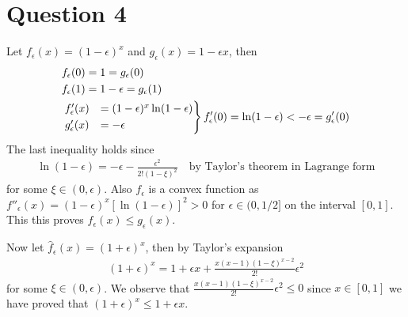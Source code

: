 \documentclass[a4paper,12pt]{article}
\theoremstyle{definition}
\begin{document}
\section*{Question 4}
Let $\label{eq:q4} f_\epsilon(x)=(1-\epsilon)^x$ and $\label{eq:q5}g_\epsilon(x)=1-\epsilon x$, then 
\begin{align*}
&f_\epsilon(0) = 1 = g_\epsilon(0)\\
&f_\epsilon(1) = 1-\epsilon = g_\epsilon(1)\\
&\begin{rcases}
 f'_\epsilon(x)&=(1-\epsilon)^x\ln (1-\epsilon) \\
  g'_\epsilon(x)&=-\epsilon \\
\end{rcases}f'_\epsilon(0) = \ln(1-\epsilon) < -\epsilon= g'_\epsilon(0)
\end{align*}
The last inequality holds since
\begin{align*}
\ln(1-\epsilon)=-\epsilon -\frac{\epsilon^2}{2!(1-\xi)^2}\quad \text{by Taylor's theorem in Lagrange form}
\end{align*}
for some $\xi \in (0,\epsilon)$. Also $f_\epsilon$ is a convex function as $f''_\epsilon(x)=(1-\epsilon)^x\left[\ln (1-\epsilon)\right]^2>0$ for $\epsilon \in(0,1/2]$ on the interval $[0,1]$. This this proves $f_\epsilon(x)\leq g_\epsilon(x)$.

Now let $\hat{f}_\epsilon(x)=(1+\epsilon)^x$, then by Taylor's expansion  %
\begin{align*}
(1+\epsilon)^x = 1 + \epsilon x + \frac{x(x-1)(1-\xi)^{x-2}}{2!}\epsilon^2
\end{align*}
for some $\xi \in (0,\epsilon)$. We observe that $\frac{x(x-1)(1-\xi)^{x-2}}{2!}\epsilon^2 \leq 0$ since $x \in [0,1]$ we have proved that $(1+\epsilon)^x \leq 1+\epsilon x$.
\end{document}
